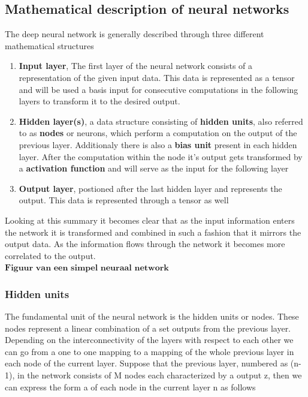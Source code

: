 \documentclass[]{article}
\begin{document}
\subsection{Mathematical description of neural networks}

The deep neural network is generally described through three different mathematical structures
\begin{enumerate}
	\item \textbf{Input layer}, The first layer of the neural network consists of a representation of the given input data. This data is represented as a tensor and will be used a basis input for consecutive computations in the following layers to transform it to the desired output.
	\item \textbf{Hidden layer(s)}, a data structure consisting of \textbf{hidden units}, also referred to as \textbf{nodes} or neurons, which perform a computation on the output of the previous layer. Additionaly there is also a \textbf{bias unit} present in each hidden layer. After the computation within the node it's output gets transformed by a \textbf{activation function} and will serve as the input for the following layer
	\item \textbf{Output layer}, postioned after the last hidden layer and represents the output. This data is represented through a tensor as well
\end{enumerate}
Looking at this summary it becomes clear that as the input information enters the network it is transformed and combined in such a fashion that it mirrors the output data. As the information flows through the network it becomes more correlated to the output. 
\\
$\textbf{Figuur van een simpel neuraal network}$
\\
\subsubsection{Hidden units}

The fundamental unit of the neural network is the hidden units or nodes. These nodes represent a linear combination of a set outputs from the previous layer. Depending on the interconnectivity of the layers with respect to each other we can go from a one to one mapping to a mapping of the whole previous layer in each node of the current layer. Suppose that the previous layer, numbered as (n-1), in the network consists of M nodes each characterized by a output z, then we can express the form a of each node in the current layer n as follows 
\end{document}
